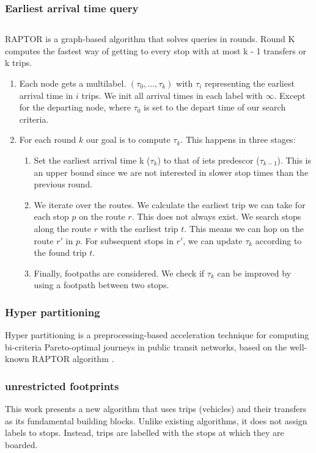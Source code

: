 \subsubsection{Earliest arrival time query}

\subsection{}
RAPTOR is a graph-based algorithm that solves queries in rounds. Round K computes the fastest way of getting to every stop with at most k - 1 transfers or k trips.

\begin{enumerate}
    \item Each node gets a multilabel. $(\tau_0,...,\tau_k)$ with $\tau_i$ representing the earliest arrival time in $i$ trips. We init all arrival times in each label with $\infty$. Except for the departing node, where $\tau_0$ is set to the depart time of our search criteria.
    \item For each round $k$ our goal is to compute $\tau_k$. This happens in three stages:\begin{enumerate}
        \item Set the earliest arrival time k ($\tau_k$) to that of iets predescor ($\tau_{k-1}$). This is an upper bound since we are not interested in slower stop times than the previous round.
        \item We iterate over the routes. We calculate the earliest trip we can take for each stop $p$ on the route $r$. This does not always exist. We search stops along the route $r$ with the earliest trip $t$. This means we can hop on the route $r'$ in $p$. For subsequent stops in $r'$, we can update $\tau_k$ according to the found trip $t$.
        \item Finally, footpaths are considered. We check if $\tau_k$ can be improved by using a footpath between two stops. 
    \end{enumerate}
\end{enumerate}

\subsubsection{Hyper partitioning}
Hyper partitioning is a preprocessing-based acceleration technique for computing bi-criteria Pareto-optimal journeys in public transit networks, based on the well-known RAPTOR algorithm \cite{delling_round-based_2015}.
\subsubsection{unrestricted footprints}
This work presents a new algorithm that uses trips (vehicles) and their transfers as its fundamental building blocks. Unlike existing algorithms, it does not assign labels to stops. Instead, trips are labelled with the stops at which they are boarded.
